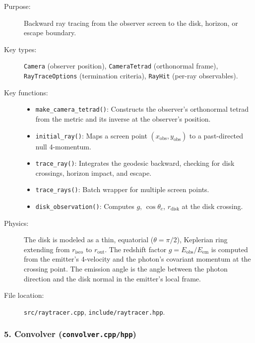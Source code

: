 \documentclass[11pt,twoside]{article}
\begin{document}
\begin{description}
\item[Purpose:] Backward ray tracing from the observer screen to the disk,
horizon, or escape boundary.
\item[Key types:] \texttt{Camera} (observer position),
\texttt{CameraTetrad} (orthonormal frame),
\texttt{RayTraceOptions} (termination criteria),
\texttt{RayHit} (per-ray observables).
\item[Key functions:]
\begin{itemize}
\item \texttt{make\_camera\_tetrad()}: Constructs the observer's orthonormal
tetrad from the metric and its inverse at the observer's position.
\item \texttt{initial\_ray()}: Maps a screen point $(x_{\text{obs}}, y_{\text{obs}})$
to a past-directed null 4-momentum.
\item \texttt{trace\_ray()}: Integrates the geodesic backward, checking for
disk crossings, horizon impact, and escape.
\item \texttt{trace\_rays()}: Batch wrapper for multiple screen points.
\item \texttt{disk\_observation()}: Computes $g$, $\cos\theta_e$, $r_{\text{disk}}$
at the disk crossing.
\end{itemize}
\item[Physics:] The disk is modeled as a thin, equatorial ($\theta = \pi/2$),
Keplerian ring extending from $r_{\text{isco}}$ to $r_{\text{out}}$. The
redshift factor $g = E_{\text{obs}}/E_{\text{em}}$ is computed from the
emitter's 4-velocity and the photon's covariant momentum at the crossing
point. The emission angle is the angle between the photon direction and the
disk normal in the emitter's local frame.
\item[File location:] \texttt{src/raytracer.cpp}, \texttt{include/raytracer.hpp}.
\end{description}

\subsubsection{5. Convolver (\texttt{convolver.cpp/hpp})}
\end{document}
